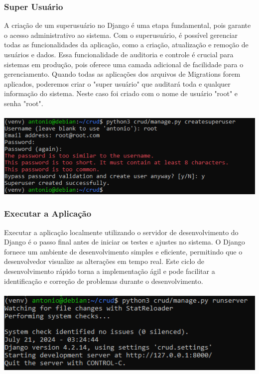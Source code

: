 \documentclass[11pt]{article} %
\begin{document}
\subsubsection{Super Usuário}
A criação de um superusuário no Django é uma etapa fundamental, pois garante o acesso administrativo ao sistema. Com o superusuário, é possível gerenciar todas as funcionalidades da aplicação, como a criação, atualização e remoção de usuários e dados. Essa funcionalidade de auditoria e controle é crucial para sistemas em produção, pois oferece uma camada adicional de facilidade para o gerenciamento.
Quando todas as aplicações dos arquivos de Migrations forem aplicados, poderemos criar o "super usuário" que auditará toda e qualquer informação do sistema. Neste caso foi criado com o nome de usuário "root" e senha "root".\\\\
\includegraphics[]{images/s7.PNG}
\subsubsection{Executar a Aplicação}
Executar a aplicação localmente utilizando o servidor de desenvolvimento do Django é o passo final antes de iniciar os testes e ajustes no sistema. O Django fornece um ambiente de desenvolvimento simples e eficiente, permitindo que o desenvolvedor visualize as alterações em tempo real. Este ciclo de desenvolvimento rápido torna a implementação ágil e pode facilitar a identificação e correção de problemas durante o desenvolvimento.\\\\
\includegraphics[]{images/s8.PNG}


\maketitle
\end{document}

